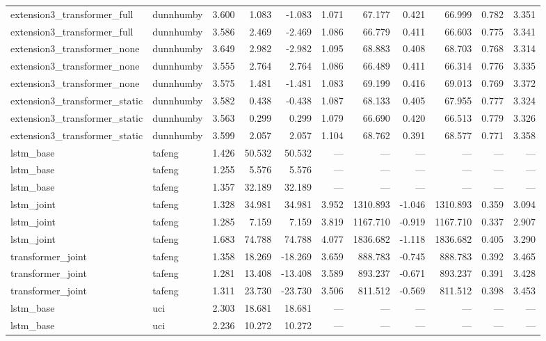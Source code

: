 \begin{table}
\begin{tabular}{llrrrrrrrrr}
extension3_transformer_full & dunnhumby & 3.600 & 1.083 & -1.083 & 1.071 & 67.177 & 0.421 & 66.999 & 0.782 & 3.351 \\
extension3_transformer_full & dunnhumby & 3.586 & 2.469 & -2.469 & 1.086 & 66.779 & 0.411 & 66.603 & 0.775 & 3.341 \\
extension3_transformer_none & dunnhumby & 3.649 & 2.982 & -2.982 & 1.095 & 68.883 & 0.408 & 68.703 & 0.768 & 3.314 \\
extension3_transformer_none & dunnhumby & 3.555 & 2.764 & 2.764 & 1.086 & 66.489 & 0.411 & 66.314 & 0.776 & 3.335 \\
extension3_transformer_none & dunnhumby & 3.575 & 1.481 & -1.481 & 1.083 & 69.199 & 0.416 & 69.013 & 0.769 & 3.372 \\
extension3_transformer_static & dunnhumby & 3.582 & 0.438 & -0.438 & 1.087 & 68.133 & 0.405 & 67.955 & 0.777 & 3.324 \\
extension3_transformer_static & dunnhumby & 3.563 & 0.299 & 0.299 & 1.079 & 66.690 & 0.420 & 66.513 & 0.779 & 3.326 \\
extension3_transformer_static & dunnhumby & 3.599 & 2.057 & 2.057 & 1.104 & 68.762 & 0.391 & 68.577 & 0.771 & 3.358 \\
lstm_base & tafeng & 1.426 & 50.532 & 50.532 & — & — & — & — & — & — \\
lstm_base & tafeng & 1.255 & 5.576 & 5.576 & — & — & — & — & — & — \\
lstm_base & tafeng & 1.357 & 32.189 & 32.189 & — & — & — & — & — & — \\
lstm_joint & tafeng & 1.328 & 34.981 & 34.981 & 3.952 & 1310.893 & -1.046 & 1310.893 & 0.359 & 3.094 \\
lstm_joint & tafeng & 1.285 & 7.159 & 7.159 & 3.819 & 1167.710 & -0.919 & 1167.710 & 0.337 & 2.907 \\
lstm_joint & tafeng & 1.683 & 74.788 & 74.788 & 4.077 & 1836.682 & -1.118 & 1836.682 & 0.405 & 3.290 \\
transformer_joint & tafeng & 1.358 & 18.269 & -18.269 & 3.659 & 888.783 & -0.745 & 888.783 & 0.392 & 3.465 \\
transformer_joint & tafeng & 1.281 & 13.408 & -13.408 & 3.589 & 893.237 & -0.671 & 893.237 & 0.391 & 3.428 \\
transformer_joint & tafeng & 1.311 & 23.730 & -23.730 & 3.506 & 811.512 & -0.569 & 811.512 & 0.398 & 3.453 \\
lstm_base & uci & 2.303 & 18.681 & 18.681 & — & — & — & — & — & — \\
lstm_base & uci & 2.236 & 10.272 & 10.272 & — & — & — & — & — & — \\

\end{tabular}
\end{table}
